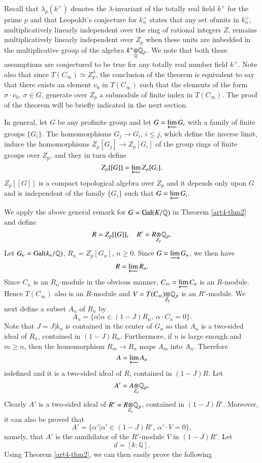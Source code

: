 \smallskip

Recall that $\lambda_{p}(k^{+})$ denotes the $\lambda$-invariant of the totally real field $k^{+}$ for the prime $p$ and that Leopoldt's conjecture for $k^{+}_{n}$ states that any set of\pageoriginale units in $k^{+}_{n}$, multiplicatively linearly independent over the ring of rational integers $Z$, remains multiplicatively linearly independent over $Z_{p}$ when these units are imbedded in the multiplicative group of the algebra $\foprod{k^{+}}{\mathbb{Q}_{p}}{\mathbb{Q}}$. We note that both these assumptions are conjectured to be true for any totally real number field $k^{+}$. Note also that since $T(C_{\infty})\simeq Z^{\lambda}_{p}$, the conclusion of the theorem is equivalent to say that there exists an element $v_{0}$ in $T(C_{\infty})$ such that the elements of the form $\sigma\cdot v_{0}$, $\sigma\in G$, generate over $Z_{p}$ a submodule of finite index in $T(C_{\infty})$. The proof of the theorem will be briefly indicated in the next section.

In general, let $G$ be any profinite group and let $G=\varprojlim G_{i}$ with a family of finite groups $\{G_{i}\}$. The homomorphisms $G_{j}\to G_{i}$, $i\leq j$, which define the inverse limit, induce the homomorphisms $Z_{p}[G_{j}]\to Z_{p}[G_{i}]$ of the group rings of finite groups over $Z_{p}$, and they in turn define
$$
Z_{p}[[G]]=\varprojlim Z_{p}[G_{i}].
$$
$Z_{p}[[G]]$ is a compact topological algebra over $Z_{p}$ and it depends only upon $G$ and is independent of the family $\{G_{i}\}$ such that $G=\varprojlim G_{i}$. 

We apply the above general remark for $G=\operatorname{Gal}(K/\mathbb{Q})$ in Theorem \ref{art4-thm2} and define
$$
R=Z_{p}[[G]],\quad R'=\foprod{R}{\mathbb{Q}_{p}}{Z_{p}}.
$$
Let $G_{n}=\operatorname{Gal}(k_{n}/\mathbb{Q})$, $R_{n}=Z_{p}[G_{n}]$, $n\geq 0$. Since $G=\varinjlim G_{n}$, we then have
$$
R=\varprojlim R_{n}.
$$
Since $C_{n}$ is an $R_{n}$-module in the obvious manner, $C_{\infty}=\varprojlim C_{n}$ is an $R$-module. Hence $T(C_{\infty})$ also is an $R$-module and $V=\foprod{T(C_{\infty})}{\mathbb{Q}_{p}}{Z_{p}}$ is an $R'$-module. We next define a subset $A_{n}$ of $R_{n}$ by
$$
A_{n}=\{\alpha |\alpha \in (1-J)R_{n}, \ \alpha\cdot C_{n}=0\}.
$$
Note that $J=J|k_{n}$ is contained in the center of $G_{n}$ so that $A_{n}$ is a two-sided ideal of $R_{n}$, contained in $(1-J)R_{n}$. Furthermore, if $n$ is large enough and $m\geq n$, then the homomorphism $R_{m}\to R_{n}$ maps $A_{m}$ into $A_{n}$. Therefore
$$
A=\varprojlim A_{n}
$$
is\pageoriginale defined and it is a two-sided ideal of $R$, contained in $(1-J)R$. Let
$$
A'=\foprod{A}{\mathbb{Q}_{p}}{Z_{p}}.
$$
Clearly $A'$ is a two-sided ideal of $R'=\foprod{R}{\mathbb{Q}_{p}}{Z_{p}}$, contained in $(1-J)R'$. Moreover, it can also be proved that
$$
A'=\{\alpha'|\alpha'\in (1-J)R', \ \alpha'\cdot V=0\},
$$
namely, that $A'$ is the annihilator of the $R'$-module $V$ in $(1-J)R'$. Let
$$
d=[k:\mathbb{Q}].
$$
Using Theorem \ref{art4-thm2}, we can then easily prove the following

